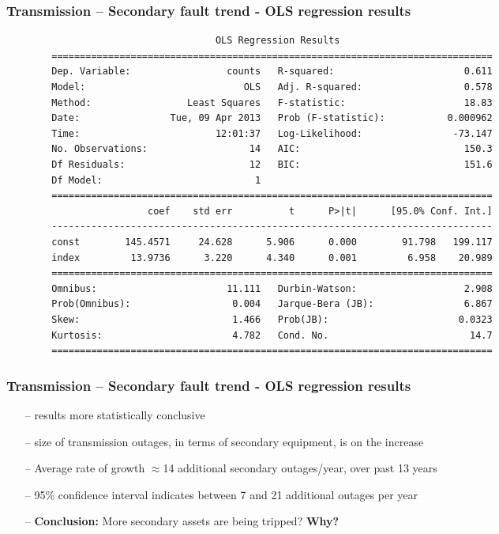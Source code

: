 \documentclass[aspectratio=169]{beamer}
\begin{document}
\begin{frame}[fragile]
  \frametitle{Transmission -- Secondary fault trend - OLS regression results}
\scriptsize
\begin{verbatim}
                                     OLS Regression Results                            
        ==============================================================================
        Dep. Variable:                 counts   R-squared:                       0.611
        Model:                            OLS   Adj. R-squared:                  0.578
        Method:                 Least Squares   F-statistic:                     18.83
        Date:                Tue, 09 Apr 2013   Prob (F-statistic):           0.000962
        Time:                        12:01:37   Log-Likelihood:                -73.147
        No. Observations:                  14   AIC:                             150.3
        Df Residuals:                      12   BIC:                             151.6
        Df Model:                           1                                         
        ==============================================================================
                         coef    std err          t      P>|t|      [95.0% Conf. Int.]
        ------------------------------------------------------------------------------
        const        145.4571     24.628      5.906      0.000        91.798   199.117
        index         13.9736      3.220      4.340      0.001         6.958    20.989
        ==============================================================================
        Omnibus:                       11.111   Durbin-Watson:                   2.908
        Prob(Omnibus):                  0.004   Jarque-Bera (JB):                6.867
        Skew:                           1.466   Prob(JB):                       0.0323
        Kurtosis:                       4.782   Cond. No.                         14.7
        ==============================================================================
\end{verbatim}
\end{frame}

\begin{frame}[fragile]
  \frametitle{Transmission -- Secondary fault trend - OLS regression results}

\begin{itemize}
   \item[--] results more statistically conclusive 
   \item[--] size of transmission outages, in terms of secondary equipment, is on the increase
   \item[--] Average rate of growth $\approx$14 additional secondary outages/year, over past 13 years
   \item[--] 95\% confidence interval indicates between 7 and 21 additional outages per year
   \item[--] \textbf{Conclusion:} More secondary assets are being tripped?  \textbf{Why?} 
\end{itemize}
\end{frame}
\end{document}

